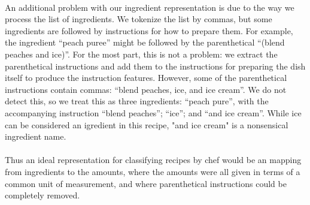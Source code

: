 \documentclass[paper=a4, fontsize=11pt]{scrartcl} %
\begin{document}
\paragraph{}
An additional problem with our ingredient representation is due to the way we process the list of ingredients. 
We tokenize the list by commas, but some ingredients are followed by instructions for how to
prepare them.  
For example, the ingredient ``peach puree'' might be followed by the parenthetical ``(blend peaches and ice)''. 
For the most part, this is not a problem: we extract the parenthetical instructions and add them to the instructions for preparing the dish itself to produce the instruction features. 
However, some of the parenthetical instructions contain commas: ``blend peaches, ice, and ice cream''. 
We do not detect this, so we treat this as three ingredients: ``peach pure'', with the accompanying instruction ``blend peaches''; ``ice''; and ``and ice cream''.  While ice can be considered an igredient in this recipe, "and ice cream" is a nonsensical ingredient name. 

\paragraph{}
Thus an ideal representation for classifying recipes by chef would be an mapping from ingredients to the amounts, where the amounts were all given in terms of a common unit of measurement, and where parenthetical instructions could be completely removed.  
\end{document}

